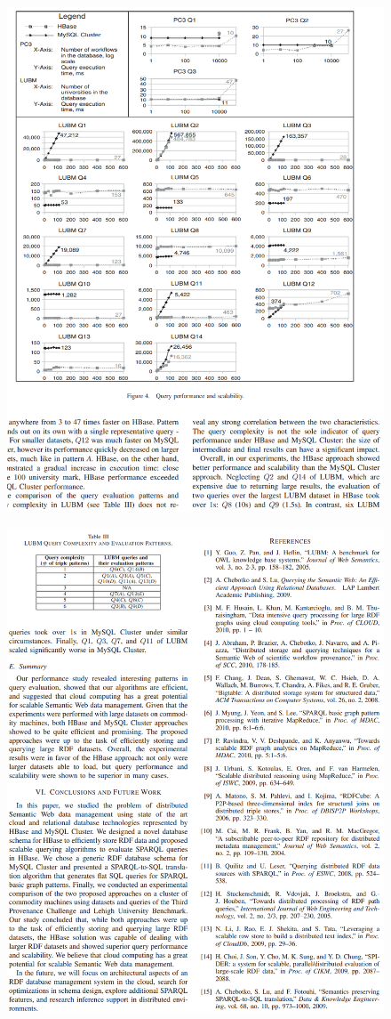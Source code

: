 \begin{figure}[!ht]
\includegraphics[scale=0.67]{photo/yingyu7.png}
\end{figure} 

\begin{figure}[!ht]
\includegraphics[scale=0.67]{photo/yingyu8.png}
\end{figure} 